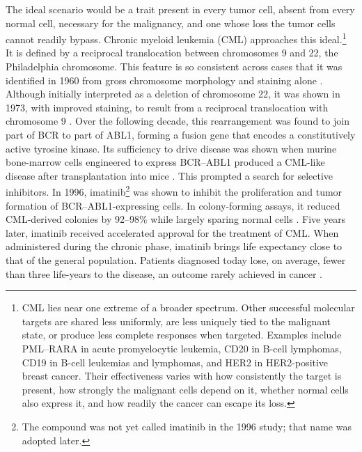 \documentclass[twocolumn]{article} %
\begin{document}
The ideal scenario would be a trait present in every tumor cell, absent from every normal cell, necessary for the malignancy, and one whose loss the tumor cells cannot readily bypass. Chronic myeloid leukemia (CML) approaches this ideal.\footnote{CML lies near one extreme of a broader spectrum. Other successful molecular targets are shared less uniformly, are less uniquely tied to the malignant state, or produce less complete responses when targeted. Examples include PML--RARA in acute promyelocytic leukemia, CD20 in B-cell lymphomas, CD19 in B-cell leukemias and lymphomas, and HER2 in HER2-positive breast cancer. Their effectiveness varies with how consistently the target is present, how strongly the malignant cells depend on it, whether normal cells also express it, and how readily the cancer can escape its loss.} It is defined by a reciprocal translocation between chromosomes 9 and 22, the Philadelphia chromosome. This feature is so consistent across cases that it was identified in 1960 from gross chromosome morphology and staining alone \cite{nowell1960minute}. Although initially interpreted as a deletion of chromosome 22, it was shown in 1973, with improved staining, to result from a reciprocal translocation with chromosome 9 \citep[a]{nowell1960minute}. Over the following decade, this rearrangement was found to join part of BCR to part of ABL1, forming a fusion gene that encodes a constitutively active tyrosine kinase. Its sufficiency to drive disease was shown when murine bone-marrow cells engineered to express BCR–ABL1 produced a CML-like disease after transplantation into mice \citep[a]{pane1996neutrophilic}. This prompted a search for selective inhibitors. In 1996, imatinib\footnote{The compound was not yet called imatinib in the 1996 study; that name was adopted later.} was shown to inhibit the proliferation and tumor formation of BCR–ABL1-expressing cells. In colony-forming assays, it reduced CML-derived colonies by 92–98\% while largely sparing normal cells \cite{druker1996effects}. Five years later, imatinib received accelerated approval for the treatment of CML. When administered during the chronic phase, imatinib brings life expectancy close to that of the general population. Patients diagnosed today lose, on average, fewer than three life-years to the disease, an outcome rarely achieved in cancer \cite{wedelin1986clinical, bower2016life, druker2025imatinib}.
\end{document}

